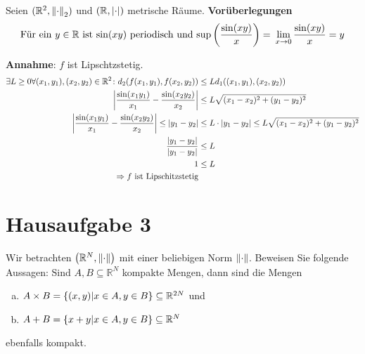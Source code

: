 \documentclass{scrreprt}
\begin{document}
Seien $(\mathbb{R}^2, \norm{\cdot}_2)$ und $(\mathbb{R}, \abs{\cdot})$
metrische Räume. \textbf{Vorüberlegungen}
\[
  \text{Für ein $y \in \mathbb{R}$ ist $\sin(xy)$ periodisch und $\sup\qty(\frac{\sin(xy)}{x}) = $ }
  \lim_{x \to 0} \frac{\sin(xy)}{x} = y
\]

\textbf{Annahme}: $f$ ist Lipschtzstetig.
\begin{align*}
  \exists L \geq 0 \forall (x_1, y_1), (x_2, y_2) \in \mathbb{R}^2 \colon d_2(f(x_1, y_1), f(x_2, y_2))
    &\leq L d_1((x_1, y_1), (x_2, y_2)) \\
  \abs{\frac{\sin(x_1y_1)}{x_1} - \frac{\sin(x_2y_2)}{x_2}}
    &\leq L \sqrt{(x_1 - x_2)^2 + (y_1 - y_2)^2} \\
  \abs{\frac{\sin(x_1y_1)}{x_1} - \frac{\sin(x_2y_2)}{x_2}}
    \leq \abs{y_1 - y_2} &\leq L \cdot \abs{y_1 - y_2}
    \leq L\sqrt{(x_1 - x_2)^2 + (y_1 - y_2)^2} \\
  \frac{\abs{y_1 - y_2}}{\abs{y_1 - y_2}} &\leq L \\
  1 &\leq L \\
  \Rightarrow f \text{ ist Lipschitzstetig}
\end{align*}

\newpage
\section*{Hausaufgabe 3}

Wir betrachten $\qty(\mathbb{R}^N, \norm{\cdot})$ mit einer beliebigen Norm
$\norm{\cdot}$.
Beweisen Sie folgende Aussagen: Sind $A, B \subseteq \mathbb{R}^N$ kompakte
Mengen, dann sind die Mengen
\begin{enumerate}[a)]
\item $A \times B = \qty{(x, y) \middle| x \in A, y \in B} \subseteq \mathbb{R}^{2N}$ und
\item $A + B = \qty{x + y \middle| x \in A, y \in B} \subseteq \mathbb{R}^N$
\end{enumerate}
ebenfalls kompakt. \\
\end{document}
